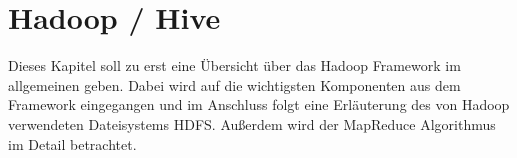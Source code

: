 \section{Hadoop / Hive}
Dieses Kapitel soll zu erst eine Übersicht über das Hadoop Framework im allgemeinen geben. Dabei wird auf die wichtigsten Komponenten aus dem Framework eingegangen und im Anschluss folgt eine Erläuterung des von Hadoop verwendeten Dateisystems HDFS. Außerdem wird der MapReduce Algorithmus im Detail betrachtet.









